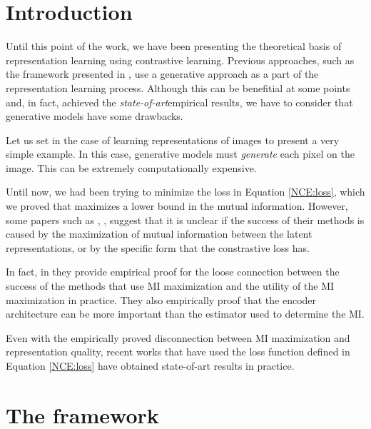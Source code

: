 \label{Chapter:SimCLR-BYOL}
\section{Introduction}

Until this point of the work, we have been presenting the theoretical basis of representation learning using contrastive learning. Previous approaches, such as  the framework presented in \cite{oord_representation_2019}, use a generative approach as a part of the representation learning process. Although this can be benefitial at some points and, in fact, achieved the \emph{state-of-art}\footnotemark empirical results, we have to consider that generative models have some drawbacks. 



Let us set in the case of learning representations of images to present a very simple example. In this case, generative models must \emph{generate} each pixel on the image. This can be extremely computationally expensive. 

Until now, we had been trying to minimize the loss in Equation \eqref{NCE:loss}, which we proved that maximizes a lower bound in the mutual information. However, some papers such as \cite{chen_simple_2020}, \cite{tschannen_mutual_2020}, suggest that it is unclear if the success of their methods is caused by the maximization of mutual information between the latent representations, or by the specific form that the constrastive loss has.

In fact, in \cite{tschannen_mutual_2020} they provide empirical proof for the loose connection between the success of the methods that use MI maximization and the utility of the MI maximization in practice. They also empirically proof  that the encoder architecture can be more important than the estimator used to determine the MI.

Even with the empirically proved disconnection between MI maximization and representation quality, recent works that have used the loss function defined in Equation \eqref{NCE:loss} have obtained state-of-art results in practice. 

\section{The framework}


